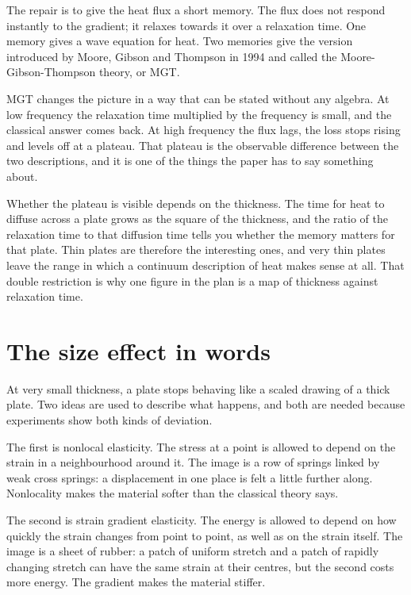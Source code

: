 \documentclass[11pt]{article}
\begin{document}
The repair is to give the heat flux a short memory. The flux does not respond instantly to the gradient; it
relaxes towards it over a relaxation time. One memory gives a wave equation for heat. Two memories give the
version introduced by Moore, Gibson and Thompson in 1994 and called the Moore-Gibson-Thompson theory, or MGT.

MGT changes the picture in a way that can be stated without any algebra. At low frequency the relaxation time
multiplied by the frequency is small, and the classical answer comes back. At high frequency the flux lags,
the loss stops rising and levels off at a plateau. That plateau is the observable difference between the two
descriptions, and it is one of the things the paper has to say something about.

Whether the plateau is visible depends on the thickness. The time for heat to diffuse across a plate grows as
the square of the thickness, and the ratio of the relaxation time to that diffusion time tells you whether
the memory matters for that plate. Thin plates are therefore the interesting ones, and very thin plates leave
the range in which a continuum description of heat makes sense at all. That double restriction is why one
figure in the plan is a map of thickness against relaxation time.

\section{The size effect in words}

At very small thickness, a plate stops behaving like a scaled drawing of a thick plate. Two ideas are used to
describe what happens, and both are needed because experiments show both kinds of deviation.

The first is nonlocal elasticity. The stress at a point is allowed to depend on the strain in a neighbourhood
around it. The image is a row of springs linked by weak cross springs: a displacement in one place is felt a
little further along. Nonlocality makes the material softer than the classical theory says.

The second is strain gradient elasticity. The energy is allowed to depend on how quickly the strain changes
from point to point, as well as on the strain itself. The image is a sheet of rubber: a patch of uniform
stretch and a patch of rapidly changing stretch can have the same strain at their centres, but the second
costs more energy. The gradient makes the material stiffer.
\end{document}
